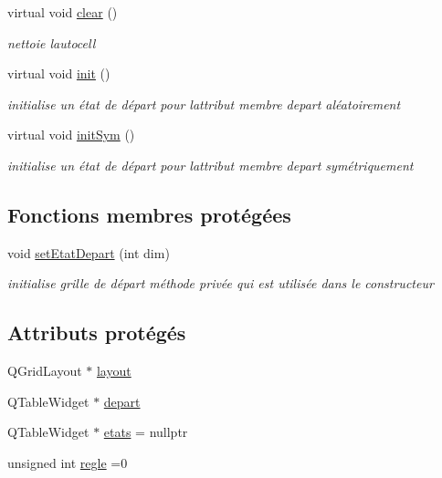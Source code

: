 \begin{DoxyCompactItemize}
virtual void \hyperlink{class_autocell1_d_a711408c00cac1a00112ce8a72eab5b48}{clear} ()
\begin{DoxyCompactList}\small\item\em nettoie l\textquotesingle{}autocell \end{DoxyCompactList}\item 
virtual void \hyperlink{class_autocell1_d_a53c95905c3b33bf49a92b64f39ec2c29}{init} ()
\begin{DoxyCompactList}\small\item\em initialise un état de départ pour l\textquotesingle{}attribut membre depart aléatoirement \end{DoxyCompactList}\item 
virtual void \hyperlink{class_autocell1_d_a5ad8a1b903cca1cce5965d22039b6e04}{init\+Sym} ()
\begin{DoxyCompactList}\small\item\em initialise un état de départ pour l\textquotesingle{}attribut membre depart symétriquement \end{DoxyCompactList}\end{DoxyCompactItemize}
\subsection*{Fonctions membres protégées}
\begin{DoxyCompactItemize}
\item 
void \hyperlink{class_autocell1_d_af7a137f43564c602e7503b34a232c4e0}{set\+Etat\+Depart} (int dim)
\begin{DoxyCompactList}\small\item\em initialise grille de départ méthode privée qui est utilisée dans le constructeur \end{DoxyCompactList}\end{DoxyCompactItemize}
\subsection*{Attributs protégés}
\begin{DoxyCompactItemize}
\item 
Q\+Grid\+Layout $\ast$ \hyperlink{class_autocell1_d_a7934db954892dc0efc12a961686a75c0}{layout}
\item 
Q\+Table\+Widget $\ast$ \hyperlink{class_autocell1_d_a7bd65a39691f86e179bcb0466e7e38c2}{depart}
\item 
Q\+Table\+Widget $\ast$ \hyperlink{class_autocell1_d_aed4038c48d9cc0a841e6f565d4cd792c}{etats} = nullptr
\item 
unsigned int \hyperlink{class_autocell1_d_ae28c4a70102bd5e08a2414d27b20bb47}{regle} =0
\end{DoxyCompactItemize}
